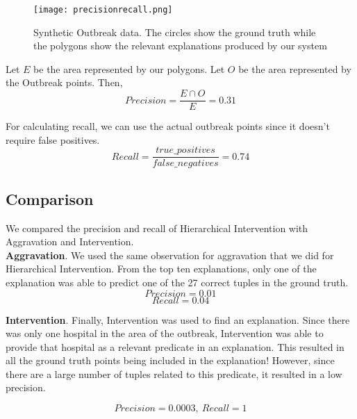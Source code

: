 \begin{figure}[h]
\texttt{[image: precisionrecall.png]}
\caption{Synthetic Outbreak data. The circles show the ground truth while the polygons show the relevant explanations produced by our system}
\label{fig:precisionrecall}
\end{figure}

Let $E$ be the area represented by our polygons. Let $O$ be the area represented by the Outbreak points. Then,
$$Precision = \frac{E \cap O}{E} = 0.31$$

For calculating recall, we can use the actual outbreak points since it doesn't require false positives.
$$Recall = \frac{true\_positives}{false\_negatives} = 0.74$$




\subsection{Comparison}
We compared the precision and recall of Hierarchical Intervention with Aggravation and Intervention.
\\
\textbf{Aggravation}. We used the same observation for aggravation that we did for Hierarchical Intervention. From the top ten explanations, only one of the explanation was able to predict one of the 27 correct tuples in the ground truth.
$$Precision = 0.01$$
$$Recall = 0.04$$


\textbf{Intervention}. Finally, Intervention was used to find an explanation. Since there was only one hospital in the area of the outbreak, Intervention was able to provide that hospital as a relevant predicate in an explanation. This resulted in all the ground truth points being included in the explanation! However, since there are a large number of tuples related to this predicate, it resulted in a low precision.

$$Precision = 0.0003,\ Recall = 1$$









